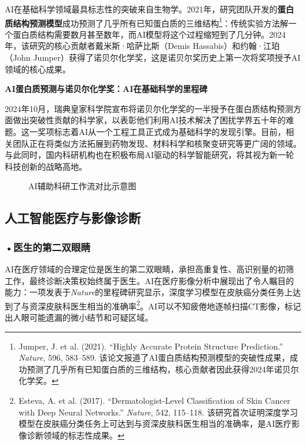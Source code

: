 AI在基础科学领域最具标志性的突破来自生物学。2021年，研究团队开发的\textbf{蛋白质结构预测模型}成功预测了几乎所有已知蛋白质的三维结构\footnote{Jumper, J. et al. (2021). ``Highly Accurate Protein Structure Prediction.'' \emph{Nature}, 596, 583--589. 该论文报道了AI蛋白质结构预测模型的突破性成果，成功预测了几乎所有已知蛋白质的三维结构，核心贡献者因此获得2024年诺贝尔化学奖。}：传统实验方法解一个蛋白质结构需要数月甚至数年，而AI模型将这个过程缩短到了几分钟。2024年，该研究的核心贡献者戴米斯·哈萨比斯（Demis Hassabis）和约翰·江珀（John Jumper）获得了诺贝尔化学奖，这是诺贝尔奖历史上第一次将奖项授予AI领域的核心成果。

\begin{funbox}
\small\textbf{AI蛋白质预测与诺贝尔化学奖：AI在基础科学的里程碑}

2024年10月，瑞典皇家科学院宣布将诺贝尔化学奖的一半授予在蛋白质结构预测方面做出突破性贡献的科学家，以表彰他们利用AI技术解决了困扰学界五十年的难题。这一奖项标志着AI从一个工程工具正式成为基础科学的发现引擎。目前，相关团队正在将类似方法拓展到药物发现、材料科学和核聚变研究等更广阔的领域。与此同时，国内科研机构也在积极布局AI驱动的科学智能研究，将其视为新一轮科技创新的战略高地。
\end{funbox}

\begin{figure}[htbp]
\centering
{}
\caption{AI辅助科研工作流对比示意图}
\label{fig:ch1_09}
\end{figure}

\subsection{人工智能医疗与影像诊断}

\subsubsection*{\textbf{•医生的第二双眼睛}}

AI在医疗领域的合理定位是医生的第二双眼睛，承担高重复性、高识别量的初筛工作，最终诊断决策权始终属于医生。AI在医疗影像分析中展现出了令人瞩目的能力：一项发表于\emph{Nature}的里程碑研究显示，深度学习模型在皮肤癌分类任务上达到了与资深皮肤科医生相当的准确率\footnote{Esteva, A. et al. (2017). ``Dermatologist-Level Classification of Skin Cancer with Deep Neural Networks.'' \emph{Nature}, 542, 115--118. 该研究首次证明深度学习模型在皮肤癌分类任务上可达到与资深皮肤科医生相当的准确率，是AI医疗影像诊断领域的标志性成果。}。AI可以不知疲倦地逐帧扫描CT影像，标记出人眼可能遗漏的微小结节和可疑区域。


